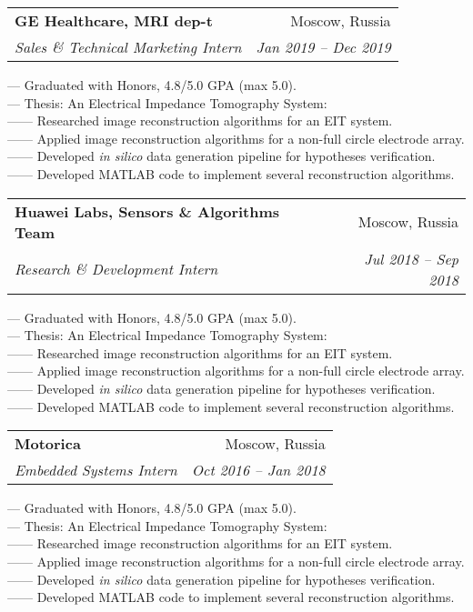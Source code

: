 \documentclass[letterpaper,11pt]{article}
\makeatletter
\newcommand{\resumeSubheading}[4]{
  \vspace{-2pt}\item
    \begin{tabular*}{0.97\textwidth}[t]{l@{\extracolsep{\fill}}r}
      \textbf{#1} & #2 \\
      \textit{\small#3} & \textit{\small #4} \\
    \end{tabular*}\vspace{-7pt}
}
\makeatother
\begin{document}
    \resumeSubheading
      {GE Healthcare, MRI dep-t}{Moscow, Russia}
      {Sales \& Technical Marketing Intern}{Jan 2019 -- Dec 2019}
      \begin{itemize}[leftmargin=0in, label={}]
            \small{\item{
                {— Graduated with Honors, 4.8/5.0 GPA (max 5.0).}\\
                {— Thesis: An Electrical Impedance Tomography System:}\\
                {—— Researched image reconstruction algorithms for an EIT system.}\\
                {—— Applied image reconstruction algorithms for a non-full circle electrode array.}\\
                {—— Developed \textit{in silico} data generation pipeline for hypotheses verification.}\\
                {—— Developed MATLAB code to implement several reconstruction algorithms.}
            }}
      \end{itemize}

    \resumeSubheading
      {Huawei Labs, Sensors \& Algorithms Team}{Moscow, Russia}
      {Research \& Development Intern}{Jul 2018 -- Sep 2018}
      \begin{itemize}[leftmargin=0in, label={}]
            \small{\item{
                {— Graduated with Honors, 4.8/5.0 GPA (max 5.0).}\\
                {— Thesis: An Electrical Impedance Tomography System:}\\
                {—— Researched image reconstruction algorithms for an EIT system.}\\
                {—— Applied image reconstruction algorithms for a non-full circle electrode array.}\\
                {—— Developed \textit{in silico} data generation pipeline for hypotheses verification.}\\
                {—— Developed MATLAB code to implement several reconstruction algorithms.}
            }}
      \end{itemize}

    \resumeSubheading
      {Motorica}{Moscow, Russia}
      {Embedded Systems Intern}{Oct 2016 -- Jan 2018}
      \begin{itemize}[leftmargin=0in, label={}]
            \small{\item{
                {— Graduated with Honors, 4.8/5.0 GPA (max 5.0).}\\
                {— Thesis: An Electrical Impedance Tomography System:}\\
                {—— Researched image reconstruction algorithms for an EIT system.}\\
                {—— Applied image reconstruction algorithms for a non-full circle electrode array.}\\
                {—— Developed \textit{in silico} data generation pipeline for hypotheses verification.}\\
                {—— Developed MATLAB code to implement several reconstruction algorithms.}
            }}
      \end{itemize}
      
\end{document}
